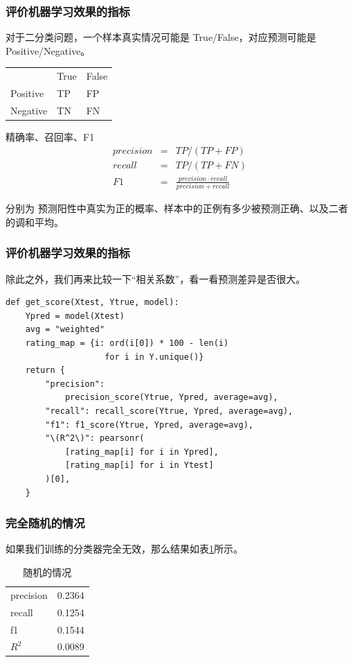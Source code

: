\begin{frame}
    \frametitle{评价机器学习效果的指标}
    对于二分类问题，一个样本真实情况可能是 True/False，对应预测可能是 Positive/Negative。
    \begin{center}
        \begin{tabular}{lll}
                     & True & False \\
            Positive & TP   & FP    \\
            Negative & TN   & FN    \\
        \end{tabular}
    \end{center}
    \begin{definition}{精确率、召回率、F1}
        \begin{eqnarray}
            precision & = & TP / (TP + FP) \nonumber\\
            recall & = & TP / (TP + FN) \nonumber\\
            F1 & = & \frac{precision\cdot recall}{precision+recall}\nonumber
        \end{eqnarray}
    \end{definition}
    分别为 预测阳性中真实为正的概率、样本中的正例有多少被预测正确、以及二者的调和平均。
\end{frame}

\begin{frame}[fragile]
    \frametitle{评价机器学习效果的指标}
    除此之外，我们再来比较一下“相关系数”，看一看预测差异是否很大。
    \begin{verbatim}
def get_score(Xtest, Ytrue, model):
    Ypred = model(Xtest)
    avg = "weighted"
    rating_map = {i: ord(i[0]) * 100 - len(i)
                    for i in Y.unique()}
    return {
        "precision":
            precision_score(Ytrue, Ypred, average=avg),
        "recall": recall_score(Ytrue, Ypred, average=avg),
        "f1": f1_score(Ytrue, Ypred, average=avg),
        "\(R^2\)": pearsonr(
            [rating_map[i] for i in Ypred],
            [rating_map[i] for i in Ytest]
        )[0],
    }
\end{verbatim}
\end{frame}
\begin{frame}
    \frametitle{完全随机的情况}
    如果我们训练的分类器完全无效，那么结果如表\ref{random}所示。
    \begin{table}
        \caption{随机的情况}
        \begin{tabular}{ll}
            precision & 0.2364 \\
            recall    & 0.1254 \\
            f1        & 0.1544 \\
            \(R^2\)   & 0.0089 \\
        \end{tabular}
        \label{random}
    \end{table}
\end{frame}
